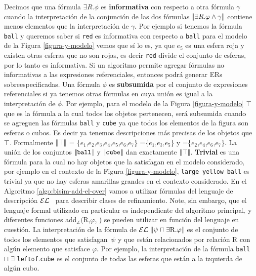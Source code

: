 Decimos que una f\'ormula $\exists R. \phi$ es \textbf{informativa} con respecto a otra f\'ormula $\gamma$ cuando la interpretaci\'on de la conjunci\'on de las dos f\'ormulas $|\!|\exists R. \varphi \land \gamma|\!|$ contiene menos elementos que la interpretaci\'on de $\gamma$. Por ejemplo si tenemos la f\'ormula \texttt{ball} y 
queremos saber si \texttt{red} es informativa con respecto a \texttt{ball} para el modelo de la Figura \ref{figura-y-modelo} vemos que s\'i lo es, ya que $e_5$ es una esfera roja y existen otras esferas que no son rojas,
 es decir \texttt{red} divide el conjunto de esferas, por lo tanto es informativa. Si un algoritmo permite agregar f\'ormulas no informativas a las expresiones referenciales, entonces podr\'a generar ERs sobreespecificadas.
Una f\'ormula $\phi$ es \textbf{subsumida} por el conjunto de expresiones referenciales si ya tenemos otras f\'ormulas en \RE cuya uni\'on es igual a la interpretaci\'on de $\phi$. Por ejemplo, para el modelo de la Figura \ref{figura-y-modelo} $\top$ que es la f\'ormula a la cual todos los objetos pertenecen, ser\'a subsumida cuando se agreguen 
las f\'ormulas \texttt{ball} y \texttt{cube} ya que todos los elementos de la figura son esferas o cubos. Es decir ya tenemos descripciones m\'as precisas de los objetos que $\top$. Formalmente $|\!|\top|\!|$ = \{$e_1$,$e_2$,$e_3$,$e_4$,$e_5$,$e_6$,$e_7$\} =\{$e_1$,$e_3$,$e_5$\} y =\{$e_2$,$e_4$,$e_6$,$e_7$\}. La uni\'on de los conjuntos $|\!|\texttt{ball}|\!|$ y $|\!|\texttt{cube}|\!|$ dan exactamente $|\!|\top|\!|$.
\textbf{Trivial} es una f\'ormula para la cual no hay objetos que la satisfagan en el modelo considerado, por ejemplo en el contexto de la 
Figura \ref{figura-y-modelo}, \texttt{large yellow ball} es trivial ya que no hay esferas amarillas grandes en el contexto considerado.
En el Algoritmo \ref{algo:bisim-add-el-over} vamos a utilizar f\'ormulas del lenguaje de descripci\'on $\mathcal{EL}$~\cite{baader03} para describir clases de refinamiento.
Note, sin embargo, que el lenguaje formal utilizado en particular es independiente del algoritmo principal, y diferentes 
funciones add$_{\mathcal {L}}$(R,$\varphi $, \RE) se pueden utilizar en funci\'on del lenguaje en cuesti\'on.
La interpretaci\'on de la f\'ormula de $\mathcal{EL}$ $\interp{\psi \sqcap \exists $R.$ \varphi}$ es el conjunto de todos los elementos que 
satisfagan~$\psi$ y que est\'an relacionados por relaci\'on R con alg\'un elemento que satisface $\varphi $.
Por ejemplo, la interpretaci\'on de la f\'ormula \texttt{ball}$\sqcap$ $\exists$ \texttt{leftof}.\texttt{cube} es el conjunto de todas las esferas que est\'an a la izquierda de alg\'un cubo.

